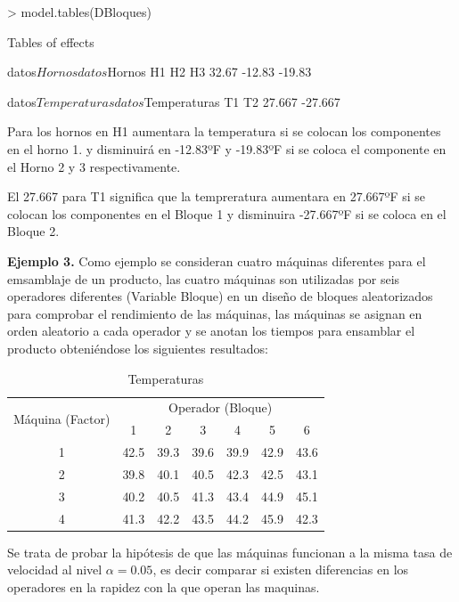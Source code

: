 \documentclass[12pt,letterpaper]{report}
\begin{document}
\begin{Schunk}
\begin{Sinput}
> model.tables(DBloques)
\end{Sinput}
\begin{Soutput}
Tables of effects

 datos$Hornos 
datos$Hornos
    H1     H2     H3 
 32.67 -12.83 -19.83 

 datos$Temperaturas 
datos$Temperaturas
     T1      T2 
 27.667 -27.667 
\end{Soutput}
\end{Schunk}
Para los hornos en H1 aumentara la temperatura si se colocan los componentes en el horno 1. y disminuirá en -12.83ºF y -19.83ºF si se coloca el componente en el Horno 2 y 3 respectivamente. 

El 27.667 para T1 significa que la tempreratura aumentara en 27.667ºF si se colocan los componentes en el Bloque 1 y disminuira -27.667ºF si se coloca en el Bloque 2.

\newpage
\textbf{Ejemplo 3.}
Como ejemplo se consideran cuatro máquinas diferentes para el emsamblaje de un producto, las cuatro máquinas son utilizadas por seis operadores diferentes (Variable Bloque) en un diseño de bloques aleatorizados para comprobar el rendimiento de las máquinas, las máquinas se asignan en orden aleatorio a cada operador y se anotan los tiempos para ensamblar el producto obteniéndose los siguientes resultados:

\begin{table}[htb]
\centering
\begin{tabular}{||c|c|c|c|c|c|c||}
\hline
\hline
\multirow{2}{*}{Máquina (Factor)}  & \multicolumn{6}{c||}{Operador (Bloque)} \\
\cline{2-7}
            &1&2&3&4&5&6 \\
\hline

  1         & 42.5 & 39.3 & 39.6 & 39.9 & 42.9 & 43.6 \\
\hline
  2         & 39.8 & 40.1 & 40.5 & 42.3 & 42.5 & 43.1 \\
\hline
  3         & 40.2 & 40.5 & 41.3 & 43.4 & 44.9 & 45.1 \\
\hline
  4         & 41.3 & 42.2 & 43.5 & 44.2 & 45.9 & 42.3 \\
\hline
\hline

\end{tabular}
\caption{Temperaturas}
\end{table}

Se trata de probar la hipótesis de que las máquinas funcionan a la misma tasa de velocidad al nivel $\alpha = 0.05$, es decir comparar si existen diferencias en los operadores en la rapidez con la que operan las maquinas.
\end{document}
